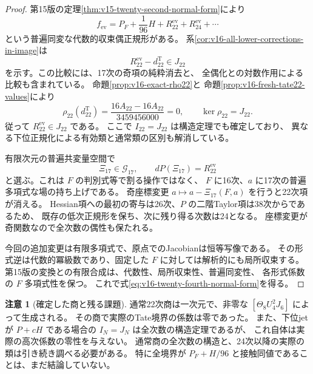 \documentclass[a4paper,11pt]{ltjsarticle}
\theoremstyle{definition}
\newtheorem{remark}[theorem]{注意}
\begin{document}
\begin{proof}
第15版の定理\ref{thm:v15-twenty-second-normal-form}により
\[
 f_{\mathrm{ev}}=P_F+\frac1{96}H+R_{22}^{\mathrm{ev}}
                             +R_{24}^{\mathrm{ev}}+\cdots
\]
という普遍同変な代数的収束偶正規形がある。
系\ref{cor:v16-all-lower-corrections-in-image}は
\[
 R_{22}^{\mathrm{ev}}-d_{22}^{\mathrm T}\in J_{22}
\]
を示す。この比較には、17次の奇項の純粋消去と、
全偶化との対数作用による比較も含まれている。
命題\ref{prop:v16-exact-rho22}と
命題\ref{prop:v16-fresh-tate22-values}により
\[
 \rho_{22}(d_{22}^{\mathrm T})
   =\frac{16A_{22}-16A_{22}}{3459456000}=0,
 \qquad\ker\rho_{22}=J_{22}.
\]
従って $R_{22}^{\mathrm{ev}}\in J_{22}$ である。
ここで $I_{22}=J_{22}$ は構造定理でも確定しており、
異なる下位正規化による有効類と通常類の区別も解消している。

有限次元の普遍共変量空間で
\[
 \Xi_{17}\in\mathcal G_{17},\qquad
                       dP(\Xi_{17})=R_{22}^{\mathrm{ev}}
\]
と選ぶ。これは $F$ の判別式等で割る操作ではなく、
$F$ に16次、$a$ に17次の普遍多項式な場の持ち上げである。
奇座標変更 $a\mapsto a-\Xi_{17}(F,a)$ を行うと22次項が消える。
Hessian項への最初の寄与は26次、$P$ の二階Taylor項は38次からであるため、
既存の低次正規形を保ち、次に残り得る次数は24となる。
座標変更が奇関数なので全次数の偶性も保たれる。

今回の追加変更は有限多項式で、原点でのJacobianは恒等写像である。
その形式逆は代数的冪級数であり、固定した $F$ に対しては解析的にも局所収束する。
第15版の変換との有限合成は、代数性、局所収束性、普遍同変性、
各形式係数の $F$ 多項式性を保つ。
これで式\eqref{eq:v16-twenty-fourth-normal-form}を得る。
\end{proof}

\begin{remark}[確定した商と残る課題]
通常22次商は一次元で、非零な $[\Theta_8U_4^2J_6]$ によって生成される。
その商で実際のTate境界の係数は零であった。
また、下位jetが $P+cH$ である場合の $I_N=J_N$ は全次数の構造定理であるが、
これ自体は実際の高次係数の零性を与えない。
通常商の全次数の構造と、24次以降の実際の類は引き続き調べる必要がある。
特に全境界が $P_F+H/96$ と接触同値であることは、まだ結論していない。
\end{remark}


\clearpage
\end{document}
